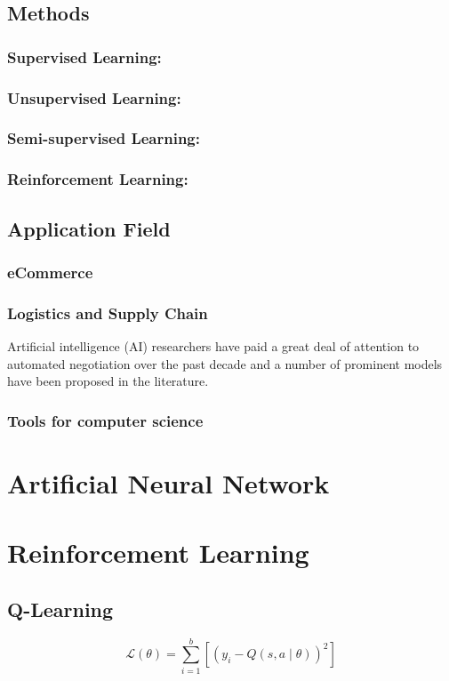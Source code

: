 \subsection{Methods}
\subsubsection{Supervised Learning:} 
\subsubsection{Unsupervised Learning:}
\subsubsection{Semi-supervised Learning:}
\subsubsection{Reinforcement Learning:}

\subsection{Application Field}
\subsubsection{eCommerce}
\subsubsection{Logistics and Supply Chain}
Artificial intelligence (AI) researchers have paid a great deal of attention to automated negotiation over the past decade and a number of prominent models have been proposed in the literature.
\subsubsection{Tools for computer science}

\section{Artificial Neural Network}

\section{Reinforcement Learning}
\subsection{Q-Learning}
\begin{equation}
\mathcal{L}(\theta)=\sum_{i=1}^{b}\left[\left(y_{i}-Q(s, a \mid \theta)\right)^{2}\right]
\end{equation}
